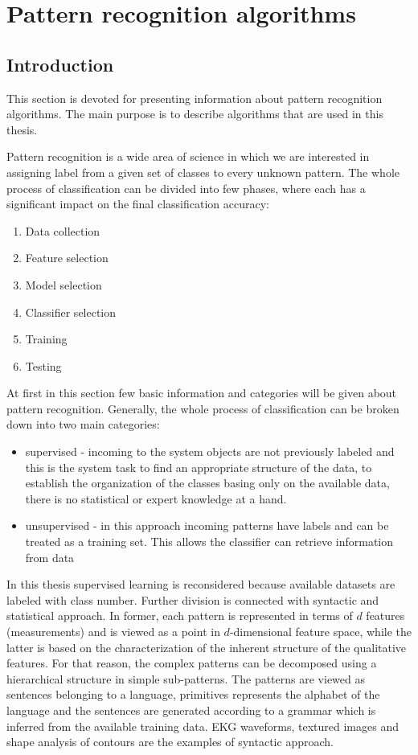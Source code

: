 \section{Pattern recognition algorithms}
\label{cha:Introduction}
\subsection{Introduction}
This section is devoted for presenting information about pattern recognition
algorithms. The main purpose is to describe algorithms that are used in this
thesis. 

Pattern recognition is a wide area of science in which we are interested in
assigning label from a given set of classes to every unknown pattern. The whole 
process of classification can be divided into few phases, where each has a
significant impact on the final classification accuracy:
\begin{enumerate}
    \item Data collection
    \item Feature selection
    \item Model selection
    \item Classifier selection
    \item Training 
    \item Testing
\end{enumerate}
At first in this section few basic information and categories will be given 
about pattern recognition. Generally, the whole process of classification
can be broken down into two main categories:
\begin{itemize}
    \item supervised - incoming to the system objects are not previously
        labeled and this is the system task to find an appropriate structure of
        the data, to establish the organization of the classes basing only on
        the available data, there is no statistical or expert knowledge at a
        hand.
    \item unsupervised - in this approach incoming patterns have labels and can
        be treated as a training set. This allows the classifier can retrieve
        information from data 
\end{itemize}
In this thesis supervised learning is reconsidered because available datasets 
are labeled with class number. Further division is connected with syntactic and statistical 
approach. In former, each pattern is represented in terms of 
$d$ features (measurements) and is viewed as a point in
$d$-dimensional feature space, while the latter
is based on the characterization of the inherent structure of the 
qualitative features. For that  reason, the complex patterns can be
decomposed using a hierarchical structure in simple  sub-patterns.
The patterns are viewed as sentences belonging to a language, primitives
represents the alphabet of the language and the sentences are generated
according to a grammar which is inferred from the available training data.
EKG waveforms, textured images and shape analysis of contours are the examples
of syntactic approach.

